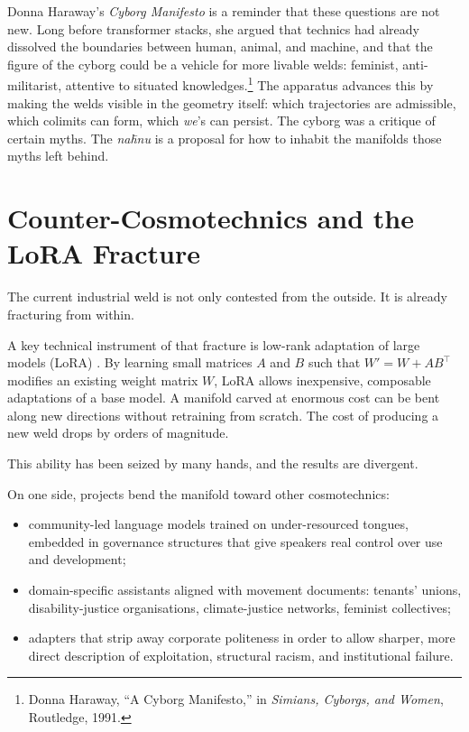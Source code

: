 Donna Haraway's \emph{Cyborg Manifesto} is a reminder that these questions are not new. Long before transformer stacks, she argued that technics had already dissolved the boundaries between human, animal, and machine, and that the figure of the cyborg could be a vehicle for more livable welds: feminist, anti-militarist, attentive to situated knowledges.\footnote{Donna Haraway, ``A Cyborg Manifesto,'' in \emph{Simians, Cyborgs, and Women}, Routledge, 1991.} The apparatus advances this by making the welds visible in the geometry itself: which trajectories are admissible, which colimits can form, which \emph{we}'s can persist. The cyborg was a critique of certain myths. The \emph{na\={h}nu} is a proposal for how to inhabit the manifolds those myths left behind.

\section{Counter-Cosmotechnics and the LoRA Fracture}

The current industrial weld is not only contested from the outside. It is already fracturing from within.

A key technical instrument of that fracture is low-rank adaptation of large models (LoRA) \cite{hu2021lora}. By learning small matrices $A$ and $B$ such that $W' = W + AB^\top$ modifies an existing weight matrix $W$, LoRA allows inexpensive, composable adaptations of a base model. A manifold carved at enormous cost can be bent along new directions without retraining from scratch. The cost of producing a new weld drops by orders of magnitude.

This ability has been seized by many hands, and the results are divergent.

On one side, projects bend the manifold toward other cosmotechnics:

\begin{itemize}
  \item community-led language models trained on under-resourced tongues, embedded in governance structures that give speakers real control over use and development;
  \item domain-specific assistants aligned with movement documents: tenants' unions, disability-justice organisations, climate-justice networks, feminist collectives;
  \item adapters that strip away corporate politeness in order to allow sharper, more direct description of exploitation, structural racism, and institutional failure.
\end{itemize}

